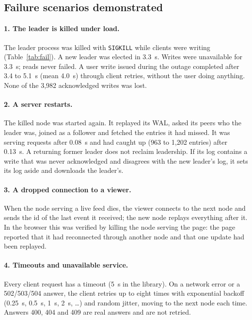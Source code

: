 \documentclass[10pt,a4paper]{article}
\newcommand{\code}[1]{\texttt{#1}}
\begin{document}
\subsection{Failure scenarios demonstrated}

\paragraph{1. The leader is killed under load.} The leader process was killed with
\code{SIGKILL} while clients were writing (Table~\ref{tab:fail}). A new leader was elected in
3.3~s. Writes were unavailable for 3.3~s; reads never failed. A user write issued during the
outage completed after 3.4 to 5.1~s (mean 4.0~s) through client retries, without the user doing
anything. None of the 3,982 acknowledged writes was lost.

\paragraph{2. A server restarts.} The killed node was started again. It replayed its WAL, asked
its peers who the leader was, joined as a follower and fetched the entries it had missed. It was
serving requests after 0.08~s and had caught up (963 to 1,202 entries) after 0.13~s. A returning
former leader does not reclaim leadership. If its log contains a write that was never
acknowledged and disagrees with the new leader's log, it sets its log aside and downloads the
leader's.

\paragraph{3. A dropped connection to a viewer.} When the node serving a live feed dies, the
viewer connects to the next node and sends the id of the last event it received; the new node
replays everything after it. In the browser this was verified by killing the node serving the
page: the page reported that it had reconnected through another node and that one update had been
replayed.

\paragraph{4. Timeouts and unavailable service.} Every client request has a timeout (5~s in the
library). On a network error or a 502/503/504 answer, the client retries up to eight times with
exponential backoff (0.25~s, 0.5~s, 1~s, 2~s, \dots) and random jitter, moving to the next node
each time. Answers 400, 404 and 409 are real answers and are not retried.
\end{document}

